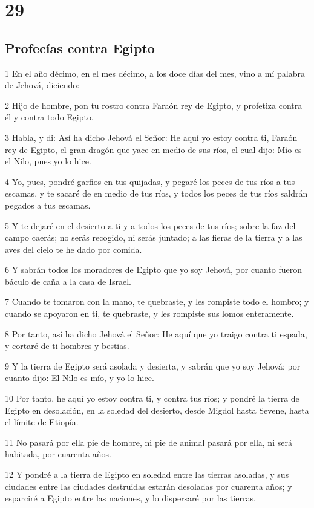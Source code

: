 \chapter{29}

\section*{Profecías contra Egipto}

\par 1 En el año décimo, en el mes décimo, a los doce días del mes, vino a mí palabra de Jehová, diciendo:
\par 2 Hijo de hombre, pon tu rostro contra Faraón rey de Egipto, y profetiza contra él y contra todo Egipto.
\par 3 Habla, y di: Así ha dicho Jehová el Señor: He aquí yo estoy contra ti, Faraón rey de Egipto, el gran dragón que yace en medio de sus ríos, el cual dijo: Mío es el Nilo, pues yo lo hice.
\par 4 Yo, pues, pondré garfios en tus quijadas, y pegaré los peces de tus ríos a tus escamas, y te sacaré de en medio de tus ríos, y todos los peces de tus ríos saldrán pegados a tus escamas.
\par 5 Y te dejaré en el desierto a ti y a todos los peces de tus ríos; sobre la faz del campo caerás; no serás recogido, ni serás juntado; a las fieras de la tierra y a las aves del cielo te he dado por comida.
\par 6 Y sabrán todos los moradores de Egipto que yo soy Jehová, por cuanto fueron báculo de caña a la casa de Israel.
\par 7 Cuando te tomaron con la mano, te quebraste, y les rompiste todo el hombro; y cuando se apoyaron en ti, te quebraste, y les rompiste sus lomos enteramente.
\par 8 Por tanto, así ha dicho Jehová el Señor: He aquí que yo traigo contra ti espada, y cortaré de ti hombres y bestias.
\par 9 Y la tierra de Egipto será asolada y desierta, y sabrán que yo soy Jehová; por cuanto dijo: El Nilo es mío, y yo lo hice. 
\par 10 Por tanto, he aquí yo estoy contra ti, y contra tus ríos; y pondré la tierra de Egipto en desolación, en la soledad del desierto, desde Migdol hasta Sevene, hasta el límite de Etiopía.
\par 11 No pasará por ella pie de hombre, ni pie de animal pasará por ella, ni será habitada, por cuarenta años.
\par 12 Y pondré a la tierra de Egipto en soledad entre las tierras asoladas, y sus ciudades entre las ciudades destruidas estarán desoladas por cuarenta años; y esparciré a Egipto entre las naciones, y lo dispersaré por las tierras.

